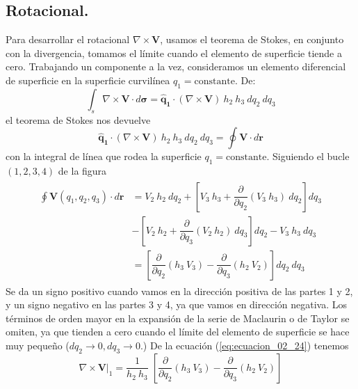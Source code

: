 \subsection{Rotacional.}
Para desarrollar el rotacional $\nabla \times \mathbf{V}$, usamos el teorema de Stokes, en conjunto con la divergencia, tomamos el límite cuando el elemento de superficie tiende a cero. Trabajando un componente a la vez, consideramos un elemento diferencial de superficie en la superficie curvilínea $q_{1} = \text{constante}$. De:
\begin{equation}
\int_{s} \nabla \times \mathbf{V} \cdot d \bm{\sigma} = \mathbf{\widehat{q}_{1}} \cdot \left( \nabla \times \mathbf{V} \right) \: h_{2} \: h_{3} \: dq_{2} \: dq_{3}
\label{eq:ecuacion_02_23}
\end{equation}
el teorema de Stokes nos devuelve
\begin{equation}
\mathbf{\widehat{q}_{1}} \cdot \left( \nabla \times \mathbf{V} \right) \: h_{2} \: h_{3} \: dq_{2} \: dq_{3} = \oint \mathbf{V} \cdot d \mathbf{r}
\label{eq:ecuacion_02_24}
\end{equation}
con la integral de línea que rodea la superficie $q_{1}=\text{constante}$. Siguiendo el bucle $(1, 2, 3, 4)$ de la figura
\begin{eqnarray}
\begin{aligned}
\oint \mathbf{V}(q_{1}, q_{2}, q_{3}) \cdot d \mathbf{r} &= V_{2} \: h_{2} \: dq_{2} + \left[ V_{3} \: h_{3} + \dfrac{\partial}{\partial q_{2}} (V_{3} \: h_{3}) \: dq_{2} \right] dq_{3} \\
&- \left[ V_{2} \: h_{2} + \dfrac{\partial}{\partial q_{3}} (V_{2} \: h_{2}) \: dq_{3} \right] dq_{2} - V_{3} \: h_{3} \: dq_{3} \\
&= \left[ \dfrac{\partial}{\partial q_{2}} (h_{3} \: V_{3}) - \dfrac{\partial}{\partial q_{3}} (h_{2} \: V_{2}) \right] dq_{2} \: dq_{3}
\end{aligned}
\label{eq:ecuacion_02_25}
\end{eqnarray}
Se da un signo positivo cuando vamos en la dirección positiva de las partes 1 y 2, y un signo negativo en las partes 3 y 4, ya que vamos en dirección negativa. Los términos de orden mayor en la expansión de la serie de Maclaurin o de Taylor se omiten, ya que tienden a cero cuando el límite del elemento de superficie se hace muy pequeño ($dq_{2} \rightarrow 0, dq_{3} \rightarrow 0$.)
De la ecuación (\ref{eq:ecuacion_02_24}) tenemos
\begin{equation}
\nabla \times \mathbf{V} \big\vert_{1} = \dfrac{1}{h_{2} \: h_{3}} \; \left[ \dfrac{\partial}{\partial q_{2}} (h_{3} \: V_{3}) - \dfrac{\partial}{\partial q_{3}} (h_{2} \:V_{2}) \right]
\label{eq:ecuacion_02_26}
\end{equation}
